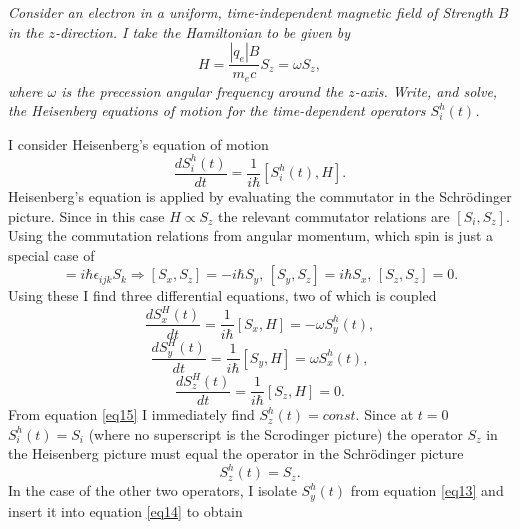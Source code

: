 \begin{example}
	\emph{Consider an electron in a uniform, time-independent magnetic field of Strength $B$ in the $z$-direction. I take the Hamiltonian to be given by}
	\begin{equation}
		H=\frac{|q_e|B}{m_ec}S_z=\omega S_z,
	\end{equation} 
	\emph{where $\omega$ is the precession angular frequency around the $z$-axis. Write, and solve, the Heisenberg equations of motion for the time-dependent operators $S_i^h(t)$.}\newline
	
	I consider Heisenberg's equation of motion
	\begin{equation}
		\frac{d S_i^h(t)}{dt}=\frac{1}{i\hbar}[S_i^h(t),H].
	\end{equation} 
	Heisenberg's equation is applied by evaluating the commutator in the Schrödinger picture. Since in this case $H\propto S_z$ the relevant commutator relations are $[S_i,S_z]$. Using the commutation relations from angular momentum, which spin is just a special case of
	\begin{equation}
		[S_i,S_j]=i\hbar\epsilon_{ijk}S_k 	\Rightarrow [S_x,S_z]=-i\hbar S_y,\, [S_y,S_z]=i\hbar S_x,\, [S_z,S_z]=0.
	\end{equation} 
	Using these I find three differential equations, two of which is coupled
	\begin{equation}
		\frac{d S_x^H(t)}{dt}=\frac{1}{i\hbar}[S_x,H]=-\omega S_y^h(t),
		\label{eq13}
	\end{equation} 
	\begin{equation}
		\frac{d S_y^H(t)}{dt}=\frac{1}{i\hbar}[S_y,H]=\omega S_x^h(t),
		\label{eq14}
	\end{equation} 
	\begin{equation}
		\frac{d S_z^H(t)}{dt}=\frac{1}{i\hbar}[S_z,H]=0.
		\label{eq15}
	\end{equation} 
	From equation \eqref{eq15} I immediately find $S_z^h(t)=const$. Since at $t=0$ $S_i^h(t)=S_i$ (where no superscript is the Scrodinger picture) the operator $S_z$ in the Heisenberg picture must equal the operator in the Schrödinger picture
	\begin{equation}
		S_z^h(t)=S_z.
	\end{equation} 
	In the case of the other two operators, I isolate $S_y^h(t)$ from equation \eqref{eq13} and insert it into equation \eqref{eq14} to obtain
	\begin{equation}

\end{equation}
\end{example}
